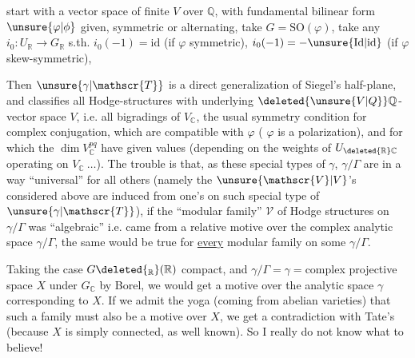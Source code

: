 start with a vector space of finite \unsure{:|{}} $V$ over $\mathbb{Q}$, with  fundamental bilinear form $\unsure{\varphi|\phi}$ given, symmetric or alternating, take $G=\mathrm{SO}(\varphi)$, take any $i_0:U_{\mathbb{R}}\to G_{\mathbb{R}}$ s.th. $i_0(-1)=\mathrm{id}$ (if $\varphi$ symmetric), $i_0(-1)=-\unsure{\mathrm{Id}|\mathrm{id}}$ (if $\varphi$  skew-symmetric),   

Then $\unsure{\gamma|\mathscr{T}}$ is a direct generalization of Siegel's half-plane, and classifies all Hodge-structures  with underlying $\deleted{\unsure{V|Q}}\mathbb{Q}$-vector space $V$,  i.e. all bigradings of $V_{\mathbb{C}}$,   the usual symmetry condition for complex conjugation, which are compatible with $\varphi$ ( $\varphi$ is a polarization), and for which the $\dim V_{\mathbb{C}}^{pq}$ have given values  (depending on the weights of $U_{\deleted{\mathbb{R}}\mathbb{C}}$ operating on $V_{\mathbb{C}}\ \ldots$). The trouble is that,  as these special types of $\gamma$, $\gamma/\Gamma$ are in a way ``universal'' for all others
(namely the $\unsure{\mathscr{V}|V}$'s considered above are induced from one's on such special type of $\unsure{\gamma|\mathscr{T}}$), if the ``modular family'' $\mathscr{V}$ of Hodge structures on  $\gamma/\Gamma$ was ``algebraic'' i.e. came from a relative motive over the complex analytic space $\gamma/\Gamma$,  the same would be true for \uline{every} modular family on some $\gamma/\Gamma$.

Taking the case $G\deleted{_{\mathbb{R}}}(\mathbb{R})$ compact,  and  $\gamma/\Gamma=\gamma={}$complex projective  space $X$ under $G_{\mathbb{C}}$ by Borel, we would get a  motive over the analytic space $\gamma$ corresponding to $X$. If we admit the  yoga (coming from  abelian varieties) that such a family must also be a motive over $X$,  we  get a contradiction with Tate's   (because $X$ is simply connected, as well known). So I really do not know what to believe!

